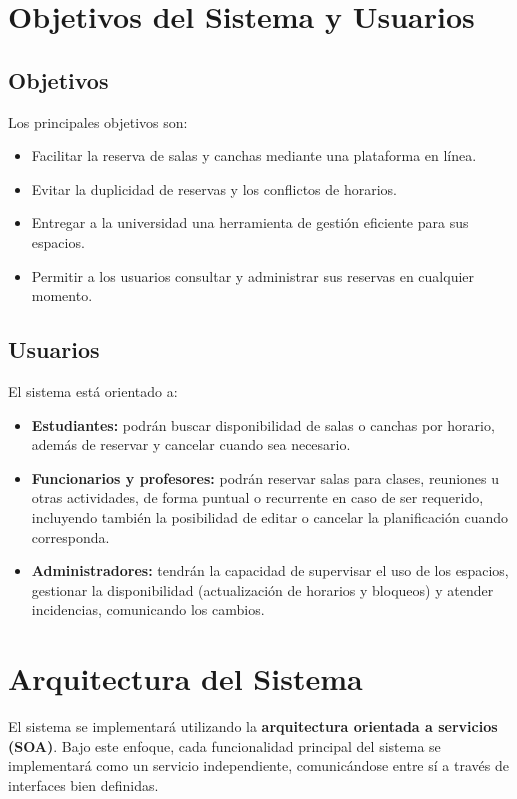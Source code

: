\documentclass[a4paper, titlepage, 12pt]{article}
\begin{document}
\section{Objetivos del Sistema y Usuarios}
\subsection{Objetivos}
Los principales objetivos son:
\begin{itemize}
    \item Facilitar la reserva de salas y canchas mediante una plataforma en línea.
    \item Evitar la duplicidad de reservas y los conflictos de horarios.
    \item Entregar a la universidad una herramienta de gestión eficiente para sus espacios.
    \item Permitir a los usuarios consultar y administrar sus reservas en cualquier momento.
\end{itemize}

\newpage
\subsection{Usuarios}
El sistema está orientado a:
\begin{itemize}
    \item \textbf{Estudiantes:} podrán buscar disponibilidad de salas o canchas por horario, además de reservar y cancelar cuando sea necesario.
    \item \textbf{Funcionarios y profesores:} podrán reservar salas para clases, reuniones u otras actividades, de forma puntual o recurrente en caso de ser requerido, incluyendo también la posibilidad de editar o cancelar la planificación cuando corresponda.
    \item \textbf{Administradores:} tendrán la capacidad de supervisar el uso de los espacios, gestionar la disponibilidad (actualización de horarios y bloqueos) y atender incidencias, comunicando los cambios.
\end{itemize}

\section{Arquitectura del Sistema}
El sistema se implementará utilizando la \textbf{arquitectura orientada a servicios (SOA)}.
Bajo este enfoque, cada funcionalidad principal del sistema se implementará como un servicio independiente, comunicándose entre sí a través de interfaces bien definidas.
\end{document}
